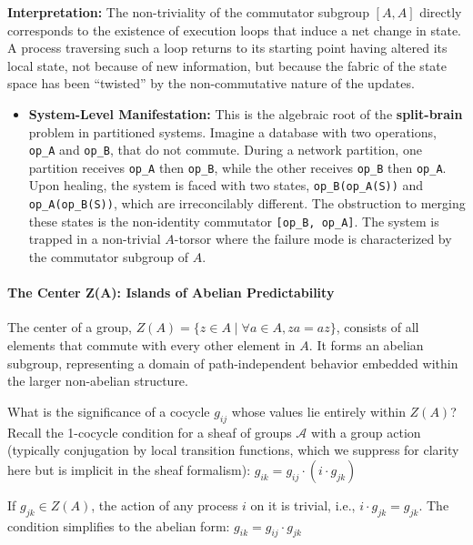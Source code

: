 \documentclass[
]{article}
\providecommand{\tightlist}{%
  \setlength{\itemsep}{0pt}\setlength{\parskip}{0pt}}
\begin{document}
\textbf{Interpretation:} The non-triviality of the commutator subgroup
\([A, A]\) directly corresponds to the existence of execution loops that
induce a net change in state. A process traversing such a loop returns
to its starting point having altered its local state, not because of new
information, but because the fabric of the state space has been
``twisted'' by the non-commutative nature of the updates.

\begin{itemize}
\tightlist
\item
  \textbf{System-Level Manifestation:} This is the algebraic root of the
  \textbf{split-brain} problem in partitioned systems. Imagine a
  database with two operations, \texttt{op\_A} and \texttt{op\_B}, that
  do not commute. During a network partition, one partition receives
  \texttt{op\_A} then \texttt{op\_B}, while the other receives
  \texttt{op\_B} then \texttt{op\_A}. Upon healing, the system is faced
  with two states, \texttt{op\_B(op\_A(S))} and
  \texttt{op\_A(op\_B(S))}, which are irreconcilably different. The
  obstruction to merging these states is the non-identity commutator
  \texttt{{[}op\_B,\ op\_A{]}}. The system is trapped in a non-trivial
  \(A\)-torsor where the failure mode is characterized by the commutator
  subgroup of \(A\).
\end{itemize}

\paragraph{The Center Z(A): Islands of Abelian
Predictability}\label{the-center-za-islands-of-abelian-predictability}

The center of a group,
\(Z(A) = \{z \in A \mid \forall a \in A, za = az\}\), consists of all
elements that commute with every other element in \(A\). It forms an
abelian subgroup, representing a domain of path-independent behavior
embedded within the larger non-abelian structure.

What is the significance of a cocycle \(g_{ij}\) whose values lie
entirely within \(Z(A)\)? Recall the 1-cocycle condition for a sheaf of
groups \(\mathcal{A}\) with a group action (typically conjugation by
local transition functions, which we suppress for clarity here but is
implicit in the sheaf formalism):
\(g_{ik} = g_{ij} \cdot (i \cdot g_{jk})\)

If \(g_{jk} \in Z(A)\), the action of any process \(i\) on it is
trivial, i.e., \(i \cdot g_{jk} = g_{jk}\). The condition simplifies to
the abelian form: \(g_{ik} = g_{ij} \cdot g_{jk}\)
\end{document}
